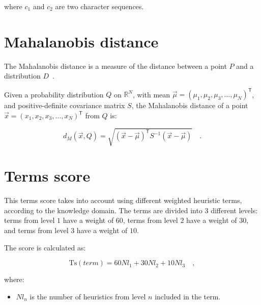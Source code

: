 \documentclass[a4paper, 12pt]{book}
\begin{document}
where $c_{1}$ and $c_{2}$ are two character sequences.

\section{Mahalanobis distance}
\label{sec:mahalanobis-definition}

The Mahalanobis distance is a measure of the distance between a point \(P\) and a distribution \(D\)~\cite{mclachlan1999mahalanobis}.

Given a probability distribution $Q$ on \(\mathbb{R} ^{N}\), with mean $\vec {\mu}=(\mu_{1},\mu_{2},\mu_{3}, \dots, \mu_{N})^{\mathsf {T}}$, and positive-definite covariance matrix $S$, the Mahalanobis distance of a point $\vec {x}=(x_{1},x_{2},x_{3},\dots ,x_{N})^{\mathsf {T}}$ from $Q$ is:


\begin{center}
    \begin{equation}
    d_{M}({\vec {x}},Q)={\sqrt {({\vec {x}}-{\vec {\mu }})^{\mathsf {T}}S^{-1}({\vec {x}}-{\vec {\mu }})}} \quad .
    \end{equation}
\end{center}

\section{Terms score}
\label{sec:terms-score-definition}

This terms score takes into account using different weighted heuristic terms, according to the knowledge domain. The terms are divided into $3$ different levels: terms from level $1$ have a weight of $60$, terms from level $2$ have a weight of $30$, and terms from level $3$ have a weight of $10$. 


The score is calculated as: 

\begin{center}
    \begin{equation}
        \mathrm {Ts}(term) = 60Nl_{1} + 30Nl_{2} + 10Nl_{3}\quad ,
    \end{equation}
\end{center}

where:
\begin{itemize}
    \item $Nl_{n}$ is the number of heuristics from level $n$ included in the term.
\end{itemize}
\end{document}
